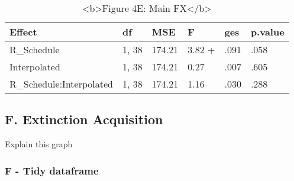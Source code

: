 \documentclass[
]{article}
\begin{document}
\begin{longtable}[l]{llllll}
\caption{\label{tab:unnamed-chunk-5}<b>Figure 4E: Main FX</b>}\\
\toprule
Effect & df & MSE & F & ges & p.value\\
\midrule
R\_Schedule & 1, 38 & 174.21 & 3.82 + & .091 & .058\\
Interpolated & 1, 38 & 174.21 & 0.27 & .007 & .605\\
R\_Schedule:Interpolated & 1, 38 & 174.21 & 1.16 & .030 & .288\\
\bottomrule
\end{longtable}

\hypertarget{f.-extinction-acquisition}{%
\subsection{F. Extinction Acquisition}\label{f.-extinction-acquisition}}

Explain this graph

\hypertarget{f---tidy-dataframe}{%
\subsubsection{F - Tidy dataframe}\label{f---tidy-dataframe}}
\end{document}
